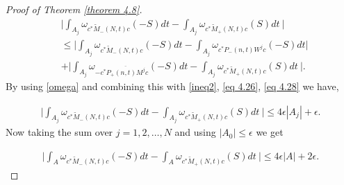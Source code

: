 \documentclass[reqno]{amsart}
\numberwithin{equation}{section}
\begin{document}
\begin{proof}[Proof of Theorem \ref{theorem 4.8}]
  \begin{align*} 
  &\Big | \int_{A_j} \omega_{c^* \tilde M_-(N,t)c} (-S) dt   -\int_{A_j} \omega_{c^* \tilde M_+(N,t)c}(S) dt\ \Big | \\ 
  & \leq 
  \Big | \int_{A_j} \omega_{c^* \tilde M_-(N,t)c} (-S) dt  - \int_{A_j} \omega_{c^* P_-(n,t) W^j c}(-S) dt \Big |\\ & + \Big | \int_{A_j} \omega_{-c^*  \overline {P_+(n,t)M^j }c }(-S) dt - \int_{A_j} \omega_{c^* \tilde M_+(N,t)c}(S) dt\ \Big |
  .\end{align*}  
 By using \eqref{omega} and   combining this with \eqref{ineq2}, \eqref{eq 4.26}, \eqref{eq 4.28} we have,
 
 \begin{align*} \Big | \int_{A_j} \omega_{c^* \tilde M_-(N,t)c} (-S) dt   -\int_{A_j} \omega_{c^* \tilde M_+(N,t)c}(S) dt\ \Big |  
   \leq 4\epsilon |A_j| + \epsilon
 . \end{align*}  
 Now taking the sum over $j=1,2, \dots,N$ and using $|A_0 |\leq \epsilon $ we get 
  
  \begin{align*}
  \Big | \int_{A} \omega_{c^* \tilde M_-(N,t)c} (-S) dt   -\int_{A} \omega_{c^* \tilde M_+(N,t)c}(S) dt\ \Big |  
   \leq 4\epsilon |A| + 2\epsilon.
  \end{align*}  \end{proof}
\end{document}

